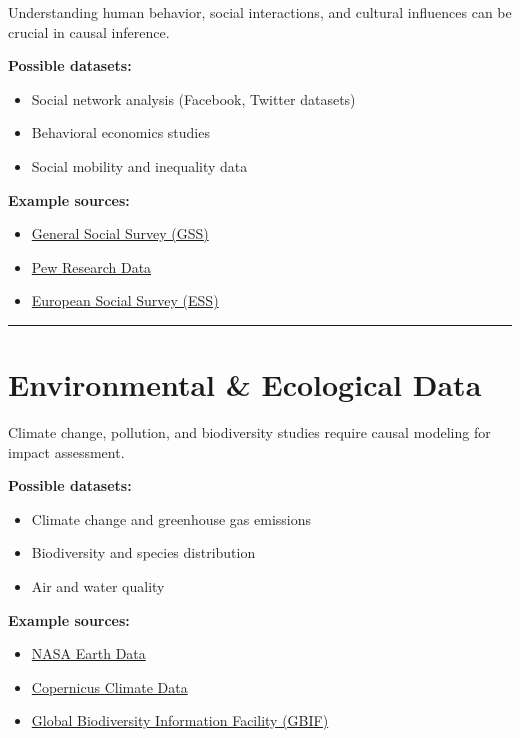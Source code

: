 \documentclass[
  letterpaper,
  DIV=11,
  numbers=noendperiod]{scrreprt}
\begin{document}
Understanding human behavior, social interactions, and cultural
influences can be crucial in causal inference.

\textbf{Possible datasets:}

\begin{itemize}
\item
  Social network analysis (Facebook, Twitter datasets)
\item
  Behavioral economics studies
\item
  Social mobility and inequality data
\end{itemize}

\textbf{Example sources:}

\begin{itemize}
\item
  \href{https://gss.norc.org/}{General Social Survey (GSS)}
\item
  \href{https://www.pewresearch.org/}{Pew Research Data}
\item
  \href{https://www.europeansocialsurvey.org/}{European Social Survey
  (ESS)}
\end{itemize}

\begin{center}\rule{0.5\linewidth}{0.5pt}\end{center}

\section{\texorpdfstring{\textbf{Environmental \& Ecological
Data}}{Environmental \& Ecological Data}}\label{environmental-ecological-data}

Climate change, pollution, and biodiversity studies require causal
modeling for impact assessment.

\textbf{Possible datasets:}

\begin{itemize}
\item
  Climate change and greenhouse gas emissions
\item
  Biodiversity and species distribution
\item
  Air and water quality
\end{itemize}

\textbf{Example sources:}

\begin{itemize}
\item
  \href{https://earthdata.nasa.gov/}{NASA Earth Data}
\item
  \href{https://cds.climate.copernicus.eu/}{Copernicus Climate Data}
\item
  \href{https://www.gbif.org/}{Global Biodiversity Information Facility
  (GBIF)}
\end{itemize}
\end{document}
